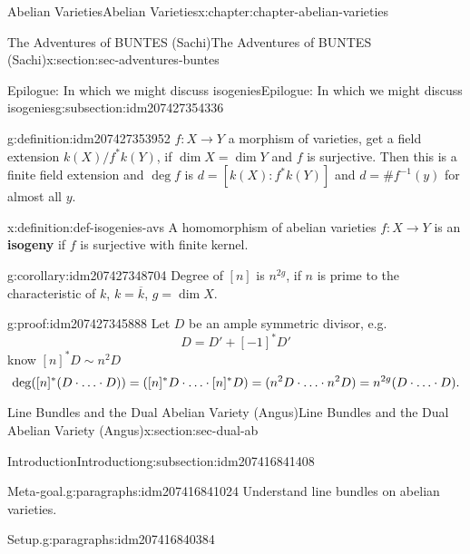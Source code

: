\documentclass[oneside,10pt,]{book}
\newcommand{\terminology}[1]{\textbf{#1}}
\newcommand{\qedhere}{\relax}
\numberwithin{equation}{section}
\newcommand{\lb}{[}
\newcommand{\rb}{]}
\begin{document}
\begin{chapterptx}{Abelian Varieties}{}{Abelian Varieties}{}{}{x:chapter:chapter-abelian-varieties}
\begin{sectionptx}{The Adventures of BUNTES (Sachi)}{}{The Adventures of BUNTES (Sachi)}{}{}{x:section:sec-adventures-buntes}
\begin{subsectionptx}{Epilogue: In which we might discuss isogenies}{}{Epilogue: In which we might discuss isogenies}{}{}{g:subsection:idm207427354336}
\begin{definition}{}{g:definition:idm207427353952}%
\(f\colon X \to Y\) a morphism of varieties, get a field extension \(k(X)/f^*k(Y)\), if \(\dim X = \dim Y\) and \(f\) is surjective. Then this is a finite field extension and \(\deg f\) is \(d = \lb k(X) : f^*k(Y)\rb\) and \(d = \#f^{-1}(y)\) for almost all \(y\).%
\end{definition}
\begin{definition}{}{x:definition:def-isogenies-avs}%
A homomorphism of abelian varieties \(f\colon X \to Y\) is an \terminology{isogeny} if \(f\) is surjective with finite kernel.%
\end{definition}
\begin{corollary}{}{}{g:corollary:idm207427348704}%
Degree of \(\lb n\rb\) is \(n^{2g}\), if \(n\) is prime to the characteristic of \(k\), \(k = \overline k\), \(g = \dim X\).%
\end{corollary}
\begin{proofptx}{}{g:proof:idm207427345888}
Let \(D\) be an ample symmetric divisor, e.g.%
\begin{equation*}
D = D' + [-1]^* D'
\end{equation*}
know \(\lb n \rb^* D \sim n^2 D\)%
\begin{equation*}
\deg([n]^*(D\cdot\ldots\cdot D)) = ([n]^*D\cdot \ldots\cdot [n]^*D) = (n^2 D\cdot\ldots\cdot n^2 D)= n^{2g} (D\cdot \ldots\cdot D)\text{.}\qedhere
\end{equation*}
%
\end{proofptx}
\end{subsectionptx}
\end{sectionptx}
%
%
\typeout{************************************************}
\typeout{************************************************}
%
\begin{sectionptx}{Line Bundles and the Dual Abelian Variety (Angus)}{}{Line Bundles and the Dual Abelian Variety (Angus)}{}{}{x:section:sec-dual-ab}
%
%
\typeout{************************************************}
\typeout{************************************************}
%
\begin{subsectionptx}{Introduction}{}{Introduction}{}{}{g:subsection:idm207416841408}
\begin{paragraphs}{Meta-goal.}{g:paragraphs:idm207416841024}%
Understand line bundles on abelian varieties.%
\end{paragraphs}%
\begin{paragraphs}{Setup.}{g:paragraphs:idm207416840384}%

\end{paragraphs}
\end{subsectionptx}
\end{sectionptx}
\end{chapterptx}
\end{document}
